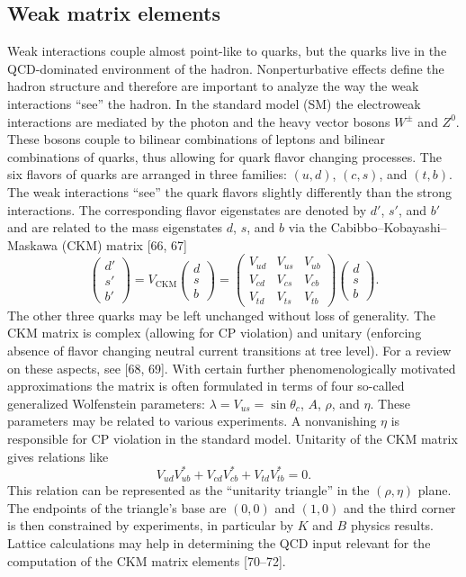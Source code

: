 \subsection{Weak matrix elements}
Weak interactions couple almost point-like to quarks, but the quarks live
in the QCD-dominated environment of the hadron. Nonperturbative effects
define the hadron structure and therefore are important to analyze the way
the weak interactions ``see'' the hadron.
In the standard model (SM) the electroweak interactions are mediated by
the photon and the heavy vector bosons $W^\pm$ and $Z^0$. These bosons couple
to bilinear combinations of leptons and bilinear combinations of quarks, thus
allowing for quark flavor changing processes. The six flavors of quarks are
arranged in three families: $(u, d)$, $(c, s)$, and $(t, b)$. The weak interactions
``see'' the quark flavors slightly differently than the strong interactions. The
corresponding flavor eigenstates are denoted by $d'$, $s'$, and $b'$ and are related to
the mass eigenstates $d$, $s$, and $b$ via the Cabibbo--Kobayashi--Maskawa (CKM)
matrix [66, 67]
\begin{equation}
\begin{pmatrix} d' \\ s' \\ b' \end{pmatrix}
= V_{\mathrm{CKM}} \begin{pmatrix} d \\ s \\ b \end{pmatrix}
= \begin{pmatrix}
V_{ud} & V_{us} & V_{ub} \\
V_{cd} & V_{cs} & V_{cb} \\
V_{td} & V_{ts} & V_{tb}
\end{pmatrix}
\begin{pmatrix} d \\ s \\ b \end{pmatrix} .
\end{equation}
The other three quarks may be left unchanged without loss of generality. The
CKM matrix is complex (allowing for CP violation) and unitary (enforcing
absence of flavor changing neutral current transitions at tree level). For a
review on these aspects, see [68, 69].
With certain further phenomenologically motivated approximations the
matrix is often formulated in terms of four so-called generalized Wolfenstein
parameters: $\lambda = V_{us} = \sin\theta_c$, $A$, $\rho$, and $\eta$. These parameters may be related
to various experiments. A nonvanishing $\eta$ is responsible for CP violation in
the standard model.
Unitarity of the CKM matrix gives relations like
\begin{equation}
V_{ud}V_{ub}^* + V_{cd}V_{cb}^* + V_{td}V_{tb}^* = 0 .
\end{equation}
This relation can be represented as the ``unitarity triangle'' in the $(\rho, \eta)$ plane.
The endpoints of the triangle's base are $(0, 0)$ and $(1, 0)$ and the third corner
is then constrained by experiments, in particular by $K$ and $B$ physics results.
Lattice calculations may help in determining the QCD input relevant for the
computation of the CKM matrix elements [70--72].

